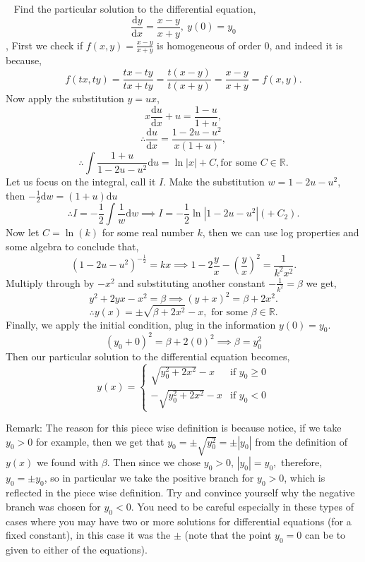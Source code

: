 \begin{example}{~}
Find the particular solution to the differential equation,
$$\frac{\mathrm{d}y}{\mathrm{d}x}=\frac{x-y}{x+y}, \ y(0)=y_0$$
\sep
First we check if $f(x,y)=\frac{x-y}{x+y}$ is homogeneous of order $0$, and indeed it is because,
$$f(tx,ty)=\frac{tx-ty}{tx+ty}=\frac{t(x-y)}{t(x+y)}=\frac{x-y}{x+y}=f(x,y).$$
Now apply the substitution $y=ux$,
$$x\frac{\mathrm{d}u}{\mathrm{d}x}+u=\frac{1-u}{1+u},$$
$$\therefore \frac{\mathrm{d}u}{\mathrm{d}x}=\frac{1-2u-u^2}{x(1+u)},$$
$$\therefore \int\frac{1+u}{1-2u-u^2}\mathrm{d}u=\ln|x|+C, \text{for some $C \in \mathbb{R}$}.$$
Let us focus on the integral, call it $I$. Make the substitution $w=1-2u-u^2$, then $-\frac{1}{2}\mathrm{d}w=(1+u)\mathrm{d}u$
$$\therefore I=-\frac{1}{2}\int \frac{1}{w}\mathrm{d}w \implies I=-\frac{1}{2}\ln|1-2u-u^2|(+ \ C_{2}).$$
Now let $C=\ln(k)$ for some real number $k$, then we can use log properties and some algebra to conclude that,
$$(1-2u-u^2)^{-\frac{1}{2}}=kx \implies 1-2\frac{y}{x}-\left(\frac{y}{x}\right)^2=\frac{1}{k^2x^2}.$$
Multiply through by $-x^2$ and substituting another constant $-\frac{1}{k^2}=\beta$ we get,
$$y^2+2yx-x^2=\beta \implies (y+x)^2=\beta+2x^2.$$
$$\therefore y(x)= \pm\sqrt{\beta+2x^2}-x, \text{ for some } \beta \in \mathbb{R}.$$
Finally, we apply the initial condition, plug in the information $y(0)=y_0$.
$$(y_0+0)^2=\beta+2(0)^2 \implies \beta = y_0^2$$
Then our particular solution to the differential equation becomes,
\[
y(x)=
\begin{cases}
\sqrt{y_0^2+2x^2}-x & \text{if $y_0 \geq 0$} \\
-\sqrt{y_0^2+2x^2}-x & \text{if $y_0<0$}
\end{cases}
\]
\end{example}

\newpage

Remark: The reason for this piece wise definition is because notice, if we take $y_0>0$ for example, then we get that $y_0=\pm\sqrt{y_0^2}=\pm|y_0|$ from the definition of $y(x)$ we found with $\beta$. Then since we chose $y_0>0$, $|y_0|=y_0,$ therefore, $y_0=\pm y_0$, so in particular we take the positive branch for $y_0>0$, which is reflected in the piece wise definition. Try and convince yourself why the negative branch was chosen for $y_0<0$.
You need to be careful especially in these types of cases where you may have two or more solutions for differential equations (for a fixed constant), in this case it was the $\pm$ (note that the point $y_0=0$ can be to given to either of the equations).



